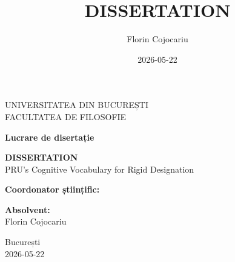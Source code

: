 \documentclass[12pt,a4paper]{article}
\title{DISSERTATION}
\author{Florin Cojocariu}
\date{2026-05-22}
\begin{document}
\pagestyle{empty}

\begin{center}
\vspace*{0.5cm}
{\large UNIVERSITATEA DIN BUCUREȘTI}\\[0.3em]
{\large FACULTATEA DE FILOSOFIE}


\vfill

{\large\bfseries Lucrare de disertație}

\vspace{2em}

{\LARGE\bfseries DISSERTATION}
\\[1em]
{\Large PRU's Cognitive Vocabulary for Rigid Designation}


\vfill
\end{center}

\noindent
\begin{minipage}[t]{0.45\textwidth}
\raggedright
\textbf{Coordonator științific:}\\

\end{minipage}%
\hfill
\begin{minipage}[t]{0.45\textwidth}
\raggedleft
\textbf{Absolvent:}\\
Florin Cojocariu
\end{minipage}

\vspace{1.5cm}

\begin{center}
{\large București}\\[0.3em]
{\large 2026-05-22}
\end{center}

\clearpage


\setcounter{tocdepth}{3}
\tableofcontents
\thispagestyle{empty}
\clearpage
\end{document}
